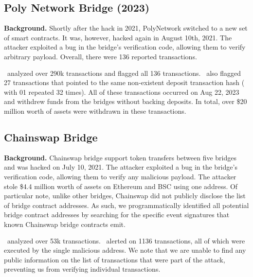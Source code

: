


\subsection{Poly Network Bridge (2023)}
\textbf{Background.} Shortly after the hack in 2021,
PolyNetwork switched to a new set of smart contracts.  It was,
however, hacked again in August 10th, 2021. The attacker exploited a
bug in the bridge's verification code, allowing them to verify
arbitrary payload. Overall, there were 136 reported transactions.

 \offlinetool~analyzed over 290k transactions and flagged all 136 transactions. \offlinetool~also flagged 27 transactions that pointed to the same non-existent deposit transaction hash ( with 01 repeated 32 times).
All of these transactions occurred on Aug 22, 2023 and withdrew funds from the bridges without backing deposits. In total, over \$20 million worth of assets were withdrawn in these transactions.


\subsection{Chainswap Bridge}
\textbf{Background.} Chainswap bridge support token transfers between five bridges and 
was hacked on July 10, 2021. The attacker exploited a bug in the bridge's verification code, allowing them to verify any malicious payload. The attacker stole \$4.4 million worth of assets on Ethereum and BSC using one address. Of particular note, unlike other bridges, Chainswap did not publicly disclose the list of bridge contract addresses. 
As such, we programmatically identified all potential bridge contract addresses by searching for the specific event signatures that known Chainswap bridge contracts emit.

 \offlinetool~analyzed over 53k transactions. \offlinetool~alerted on 1136 transactions, all of which were executed by the single malicious address. We note that we are unable to find any public information on the list of transactions that were part of the attack, preventing us from verifying individual transactions.

